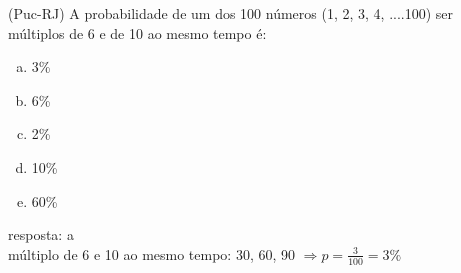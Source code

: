 \begin{ex}
 (Puc-RJ) A probabilidade de um dos 100 números (1, 2, 3, 4, ....100) ser múltiplos de 6 e de 10 ao mesmo tempo é:
    \begin{enumerate}[(a)]
    \item 3\%
    \item 6\%
    \item 2\%
    \item 10\%
    \item 60\%
    \end{enumerate} 
      \begin{sol}
        resposta: a \\
        múltiplo de 6 e 10 ao mesmo tempo: 30, 60, 90 $\Longrightarrow p=\frac{3}{100}=3\%$
      \end{sol}
      
\end{ex}